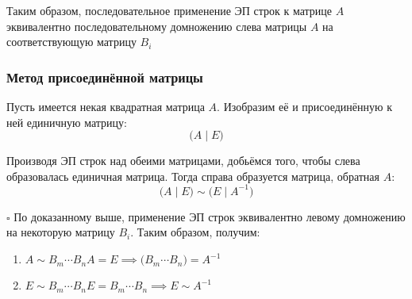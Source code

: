 \documentclass[12pt, a4paper]{report}
\begin{document}
	\bigskip Таким образом, последовательное применение ЭП строк к матрице \(A\) эквивалентно последовательному домножению слева матрицы \(A\) на соответствующую матрицу \(B_{i}\)
	
	\subsubsection{Метод присоединённой матрицы}\leavevmode
	
	Пусть имеется некая квадратная матрица \(A\). Изобразим её и присоединённую к ней единичную матрицу: \[\big(A\mid E\big)\]
	
	Производя ЭП строк над обеими матрицами, добьёмся того, чтобы слева образовалась единичная матрица. Тогда справа образуется матрица, обратная \(A\): \[\big(A\mid E\big)\sim\big(E\mid A^{-1}\big)\]
	
	\(\square\) По доказанному выше, применение ЭП строк эквивалентно левому домножению на некоторую матрицу \(B_{i}\). Таким образом, получим:
	
	\begin{enumerate}[{4.}1)]
		\item \(A\sim B_{m}\dotsb B_{n}A=E\implies \big(B_{m}\dotsb B_{n}\big) = A^{-1}\)
		\item \(E\sim B_{m}\dotsb B_{n}E = B_{m}\dotsb B_{n}\implies E\sim A^{-1}\)
	\end{enumerate}
\end{document}
